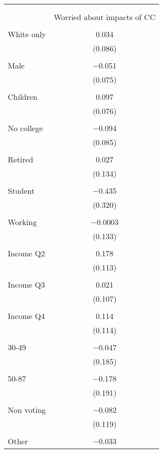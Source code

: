 
\begin{tabular}{@{\extracolsep{5pt}}lc} 
\\[-1.8ex]\hline 
\hline \\[-1.8ex] 
\\[-1.8ex] & Worried about impacts of CC \\ 
\hline \\[-1.8ex] 
 White only & 0.034 \\ 
  & (0.086) \\ 
  & \\ 
 Male & $-$0.051 \\ 
  & (0.075) \\ 
  & \\ 
 Children & 0.097 \\ 
  & (0.076) \\ 
  & \\ 
 No college & $-$0.094 \\ 
  & (0.085) \\ 
  & \\ 
 Retired & 0.027 \\ 
  & (0.134) \\ 
  & \\ 
 Student & $-$0.435 \\ 
  & (0.320) \\ 
  & \\ 
 Working & $-$0.0003 \\ 
  & (0.133) \\ 
  & \\ 
 Income Q2 & 0.178 \\ 
  & (0.113) \\ 
  & \\ 
 Income Q3 & 0.021 \\ 
  & (0.107) \\ 
  & \\ 
 Income Q4 & 0.114 \\ 
  & (0.114) \\ 
  & \\ 
 30-49 & $-$0.047 \\ 
  & (0.185) \\ 
  & \\ 
 50-87 & $-$0.178 \\ 
  & (0.191) \\ 
  & \\ 
 Non voting & $-$0.082 \\ 
  & (0.119) \\ 
  & \\ 
 Other & $-$0.033 \\ 

\end{tabular}
